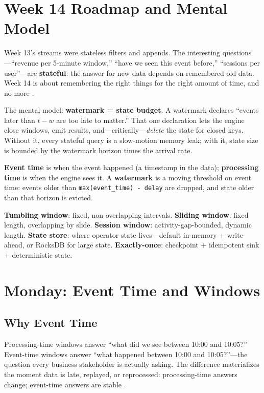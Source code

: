 \section{Week 14 Roadmap and Mental Model}
Week 13's streams were stateless filters and appends. The interesting questions---``revenue per 5-minute window,'' ``have we seen this event before,'' ``sessions per user''---are \textbf{stateful}: the answer for new data depends on remembered old data. Week 14 is about remembering the right things for the right amount of time, and no more \cite{sparkStructuredStreaming}.

The mental model: \textbf{watermark = state budget}. A watermark declares ``events later than $t - w$ are too late to matter.'' That one declaration lets the engine close windows, emit results, and---critically---\emph{delete} the state for closed keys. Without it, every stateful query is a slow-motion memory leak; with it, state size is bounded by the watermark horizon times the arrival rate.

\begin{definitionbox}
\textbf{Event time} is when the event happened (a timestamp in the data); \textbf{processing time} is when the engine sees it. A \textbf{watermark} is a moving threshold on event time: events older than \texttt{max(event\_time) - delay} are dropped, and state older than that horizon is evicted.
\end{definitionbox}

\begin{keyterms}
\textbf{Tumbling window}: fixed, non-overlapping intervals. \textbf{Sliding window}: fixed length, overlapping by slide. \textbf{Session window}: activity-gap-bounded, dynamic length. \textbf{State store}: where operator state lives---default in-memory + write-ahead, or RocksDB for large state. \textbf{Exactly-once}: checkpoint + idempotent sink + deterministic state.
\end{keyterms}

\section{Monday: Event Time and Windows}
\subsection{Why Event Time}
Processing-time windows answer ``what did we see between 10:00 and 10:05?'' Event-time windows answer ``what happened between 10:00 and 10:05?''---the question every business stakeholder is actually asking. The difference materializes the moment data is late, replayed, or reprocessed: processing-time answers change; event-time answers are stable \cite{sparkStructuredStreaming}.

